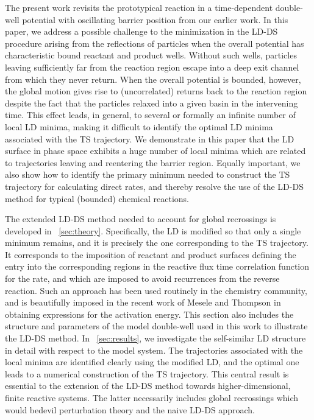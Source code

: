\documentclass[aip,reprint,jcp,amsmath,amssymb,superscriptaddress,floatfix]{revtex4-1}
\def\EDITS#1{{\color{green}#1}}
\def\EDITS#1{#1}
\def\EDITS#1{{\color{mygreen}#1}}
\begin{document}
The present work revisits
the prototypical reaction 
in a time-dependent double-well 
potential with oscillating barrier position
from our earlier work.\cite{hern16h} 
In this paper, we address 
a possible challenge to the minimization 
in the LD-DS procedure 
arising from the reflections of particles 
when the overall potential has characteristic bound 
reactant and product wells.
Without such wells, particles leaving sufficiently
far from the reaction region escape into a deep exit
channel from which they never return.
When the overall potential is 
\EDITS{bounded}, however, 
the global motion gives rise to (uncorrelated)
returns back to the 
reaction region despite the fact that the particles
relaxed into a given basin in the intervening time.
This effect leads, in general, 
to several or formally an infinite number 
of local LD minima, 
making it difficult to identify the 
optimal LD minima associated with the TS trajectory.
We demonstrate in this paper that the LD surface in phase space exhibits a 
huge number of local minima which are related to trajectories leaving and 
reentering the barrier region.
Equally important, we also show how to identify the
primary minimum needed to construct the TS trajectory 
\EDITS{for calculating direct rates},
and thereby resolve the use of the LD-DS method
for typical \EDITS{(bounded)} chemical reactions.

The extended LD-DS method needed to account for global recrossings
is developed in \SEC~\ref{sec:theory}.
Specifically, the LD is modified so that only a single 
minimum remains,
and it is precisely the one corresponding to 
the TS trajectory.
\EDITS{It corresponds to the imposition of reactant and product surfaces
defining the entry into the corresponding regions in
the reactive flux time correlation function for the rate, and which
are imposed to avoid recurrences from the reverse reaction.
Such an approach has been used routinely in the chemistry community,
and is beautifully imposed in the recent work of
Mesele and Thompson\cite{thompson16}
in obtaining expressions for the activation energy.}
This section also includes
the structure and parameters of the model double-well used 
in this work to illustrate the LD-DS method.
In \SEC~\ref{sec:results}, we investigate the self-similar LD 
structure in detail with respect to the model system.
The trajectories associated with the local minima are identified
clearly using the modified LD, and the 
optimal one 
leads to a numerical construction of 
the TS trajectory.
This central result is essential to the 
extension of the LD-DS method towards 
higher-dimensional, finite reactive systems.
The latter necessarily includes global recrossings which
would bedevil perturbation theory and the naive LD-DS approach.
\end{document}
